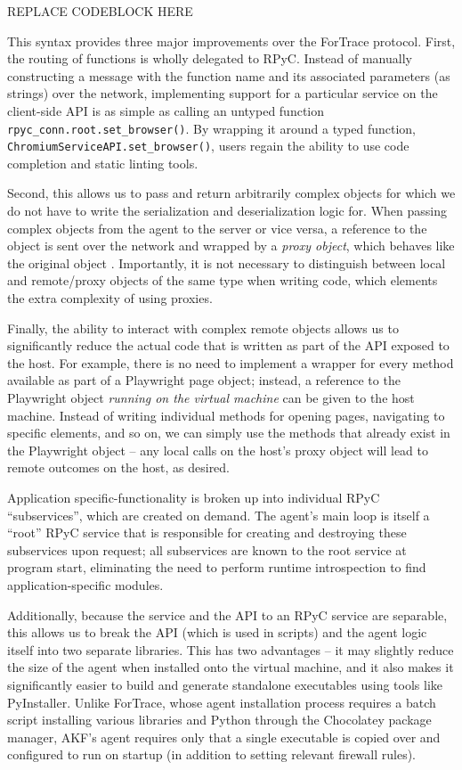 REPLACE CODEBLOCK HERE

This syntax provides three major improvements over the ForTrace
protocol. First, the routing of functions is wholly delegated to RPyC.
Instead of manually constructing a message with the function name and
its associated parameters (as strings) over the network, implementing
support for a particular service on the client-side API is as simple as
calling an untyped function \texttt{rpyc\_conn.root.set\_browser()}. By
wrapping it around a typed function,
\texttt{ChromiumServiceAPI.set\_browser()}, users regain the ability to
use code completion and static linting tools.

Second, this allows us to pass and return arbitrarily complex objects
for which we do not have to write the serialization and deserialization
logic for. When passing complex objects from the agent to the server or
vice versa, a reference to the object is sent over the network and
wrapped by a \emph{proxy object}, which behaves like the original object
\cite{TheoryOperationRPyC}. Importantly, it is not necessary to
distinguish between local and remote/proxy objects of the same type when
writing code, which elements the extra complexity of using proxies.

Finally, the ability to interact with complex remote objects allows us
to significantly reduce the actual code that is written as part of the
API exposed to the host. For example, there is no need to implement a
wrapper for every method available as part of a Playwright page object;
instead, a reference to the Playwright object \emph{running on the
virtual machine} can be given to the host machine. Instead of writing
individual methods for opening pages, navigating to specific elements,
and so on, we can simply use the methods that already exist in the
Playwright object -- any local calls on the host's proxy object will
lead to remote outcomes on the host, as desired.

Application specific-functionality is broken up into individual RPyC
``subservices'', which are created on demand. The agent's main loop is
itself a ``root'' RPyC service that is responsible for creating and
destroying these subservices upon request; all subservices are known to
the root service at program start, eliminating the need to perform
runtime introspection to find application-specific modules.

Additionally, because the service and the API to an RPyC service are
separable, this allows us to break the API (which is used in scripts)
and the agent logic itself into two separate libraries. This has two
advantages -- it may slightly reduce the size of the agent when
installed onto the virtual machine, and it also makes it significantly
easier to build and generate standalone executables using tools like
PyInstaller. Unlike ForTrace, whose agent installation process requires
a batch script installing various libraries and Python through the
Chocolatey package manager, AKF's agent requires only that a single
executable is copied over and configured to run on startup (in addition
to setting relevant firewall rules).

